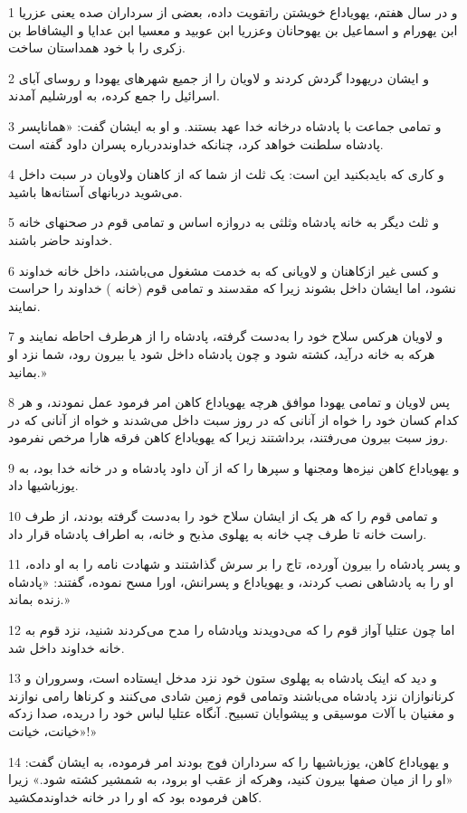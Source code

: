 \par 1 و در سال هفتم، یهویاداع خویشتن راتقویت داده، بعضی از سرداران صده یعنی عزریا ابن یهورام و اسماعیل بن یهوحانان وعزریا ابن عوبید و معسیا ابن عدایا و الیشافاط بن زکری را با خود همداستان ساخت.
\par 2 و ایشان دریهودا گردش کردند و لاویان را از جمیع شهرهای یهودا و روسای آبای اسرائیل را جمع کرده، به اورشلیم آمدند.
\par 3 و تمامی جماعت با پادشاه درخانه خدا عهد بستند. و او به ایشان گفت: «هماناپسر پادشاه سلطنت خواهد کرد، چنانکه خداونددرباره پسران داود گفته است.
\par 4 و کاری که بایدبکنید این است: یک ثلث از شما که از کاهنان ولاویان در سبت داخل می‌شوید دربانهای آستانه‌ها باشید.
\par 5 و ثلث دیگر به خانه پادشاه وثلثی به دروازه اساس و تمامی قوم در صحنهای خانه خداوند حاضر باشند.
\par 6 و کسی غیر ازکاهنان و لاویانی که به خدمت مشغول می‌باشند، داخل خانه خداوند نشود، اما ایشان داخل بشوند زیرا که مقدسند و تمامی قوم (خانه ) خداوند را حراست نمایند.
\par 7 و لاویان هرکس سلاح خود را به‌دست گرفته، پادشاه را از هرطرف احاطه نمایند و هر‌که به خانه درآید، کشته شود و چون پادشاه داخل شود یا بیرون رود، شما نزد او بمانید.»
\par 8 پس لاویان و تمامی یهودا موافق هر‌چه یهویاداع کاهن امر فرمود عمل نمودند، و هر کدام کسان خود را خواه از آنانی که در روز سبت داخل می‌شدند و خواه از آنانی که در روز سبت بیرون می‌رفتند، برداشتند زیرا که یهویاداع کاهن فرقه هارا مرخص نفرمود.
\par 9 و یهویاداع کاهن نیزه‌ها ومجنها و سپرها را که از آن داود پادشاه و در خانه خدا بود، به یوزباشیها داد.
\par 10 و تمامی قوم را که هر یک از ایشان سلاح خود را به‌دست گرفته بودند، از طرف راست خانه تا طرف چپ خانه به پهلوی مذبح و خانه، به اطراف پادشاه قرار داد.
\par 11 و پسر پادشاه را بیرون آورده، تاج را بر سرش گذاشتند و شهادت نامه را به او داده، او را به پادشاهی نصب کردند، و یهویاداع و پسرانش، اورا مسح نموده، گفتند: «پادشاه زنده بماند.»
\par 12 اما چون عتلیا آواز قوم را که می‌دویدند وپادشاه را مدح می‌کردند شنید، نزد قوم به خانه خداوند داخل شد.
\par 13 و دید که اینک پادشاه به پهلوی ستون خود نزد مدخل ایستاده است، وسروران و کرنانوازان نزد پادشاه می‌باشند وتمامی قوم زمین شادی می‌کنند و کرناها رامی نوازند و مغنیان با آلات موسیقی و پیشوایان تسبیح. آنگاه عتلیا لباس خود را دریده، صدا زدکه «خیانت، خیانت!»
\par 14 و یهویاداع کاهن، یوزباشیها را که سرداران فوج بودند امر فرموده، به ایشان گفت: «او را از میان صفها بیرون کنید، وهر‌که از عقب او برود، به شمشیر کشته شود.» زیرا کاهن فرموده بود که او را در خانه خداوندمکشید.
